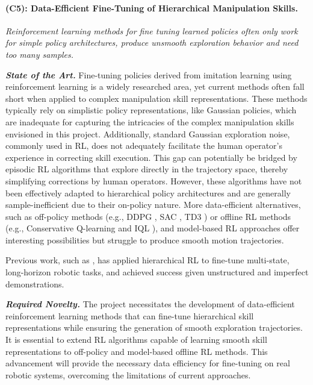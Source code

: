 \documentclass{erc-B2}
\begin{document}

\paragraph{(C5): Data-Efficient Fine-Tuning of Hierarchical Manipulation Skills.} \textit{Reinforcement learning methods for fine tuning learned policies often only work for simple policy architectures, produce unsmooth exploration behavior and need too many samples.} 

\textit{\textbf{State of the Art.}} Fine-tuning policies derived from imitation learning using reinforcement learning is a widely researched area, yet current methods often fall short when applied to complex manipulation skill representations. These methods typically rely on simplistic policy representations, like Gaussian policies, which are inadequate for capturing the intricacies of the complex manipulation skills envisioned in this project. Additionally, standard Gaussian exploration noise, commonly used in RL, does not adequately facilitate the human operator's experience in correcting skill execution. This gap can potentially be bridged by episodic RL algorithms that explore directly in the trajectory space, thereby simplifying corrections by human operators. However, these algorithms have not been effectively adapted to hierarchical policy architectures and are generally sample-inefficient due to their on-policy nature. More data-efficient alternatives, such as off-policy methods (e.g., DDPG \cite{lillicrap2015continuous}, SAC \cite{haarnoja2018soft}, TD3 \cite{fujimoto2018addressing}) or offline RL methods (e.g., Conservative Q-learning \cite{kumar2020conservative} and IQL \cite{kostrikov2021offline}), and model-based RL approaches offer interesting possibilities but struggle to produce smooth motion trajectories. 

Previous work, such as \cite{gupta2019relay}, has applied hierarchical RL to fine-tune multi-state, long-horizon robotic tasks, and achieved success given unstructured and imperfect demonstrations. 

\textit{\textbf{Required Novelty.}} The project necessitates the development of data-efficient reinforcement learning methods that can fine-tune hierarchical skill representations while ensuring the generation of smooth exploration trajectories. It is essential to extend RL algorithms capable of learning smooth skill representations to off-policy and model-based offline RL methods. This advancement will provide the necessary data efficiency for fine-tuning on real robotic systems, overcoming the limitations of current approaches.
\end{document}
